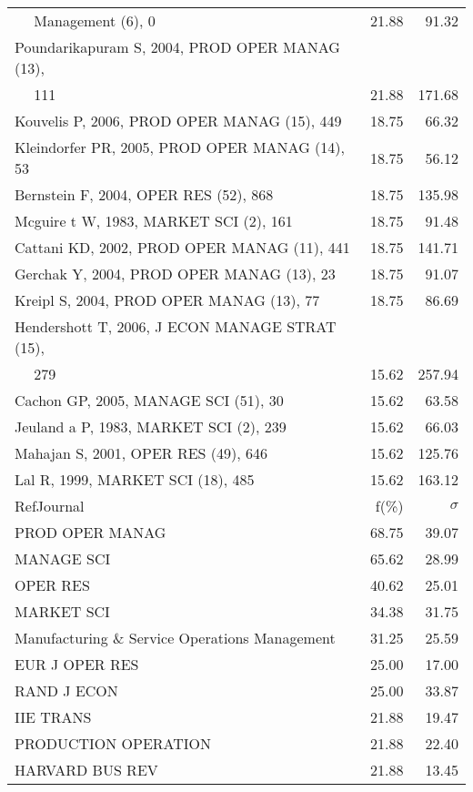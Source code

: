 \documentclass[a4paper,11pt]{report}
\begin{document}
\begin{landscape}
\begin{table}[!ht]
{\begin{tabular}{|l r r|}
$\quad$ Management (6), 0 & 21.88 & 91.32\\
Poundarikapuram S, 2004, PROD OPER MANAG (13), &  & \\
$\quad$ 111 & 21.88 & 171.68\\
Kouvelis P, 2006, PROD OPER MANAG (15), 449 & 18.75 & 66.32\\
Kleindorfer PR, 2005, PROD OPER MANAG (14), 53 & 18.75 & 56.12\\
Bernstein F, 2004, OPER RES (52), 868 & 18.75 & 135.98\\
Mcguire t W, 1983, MARKET SCI (2), 161 & 18.75 & 91.48\\
Cattani KD, 2002, PROD OPER MANAG (11), 441 & 18.75 & 141.71\\
Gerchak Y, 2004, PROD OPER MANAG (13), 23 & 18.75 & 91.07\\
Kreipl S, 2004, PROD OPER MANAG (13), 77 & 18.75 & 86.69\\
Hendershott T, 2006, J ECON MANAGE STRAT (15), &  & \\
$\quad$ 279 & 15.62 & 257.94\\
Cachon GP, 2005, MANAGE SCI (51), 30 & 15.62 & 63.58\\
Jeuland a P, 1983, MARKET SCI (2), 239 & 15.62 & 66.03\\
Mahajan S, 2001, OPER RES (49), 646 & 15.62 & 125.76\\
Lal R, 1999, MARKET SCI (18), 485 & 15.62 & 163.12\\
\hline
\hline
RefJournal & f(\%) & $\sigma$\\
\hline
PROD OPER MANAG & 68.75 & 39.07\\
MANAGE SCI & 65.62 & 28.99\\
OPER RES & 40.62 & 25.01\\
MARKET SCI & 34.38 & 31.75\\
Manufacturing \& Service Operations Management & 31.25 & 25.59\\
EUR J OPER RES & 25.00 & 17.00\\
RAND J ECON & 25.00 & 33.87\\
IIE TRANS & 21.88 & 19.47\\
PRODUCTION OPERATION & 21.88 & 22.40\\
HARVARD BUS REV & 21.88 & 13.45\\
\hline
\end{tabular}
}
\end{table}

\clearpage


\end{landscape}
\end{document}
